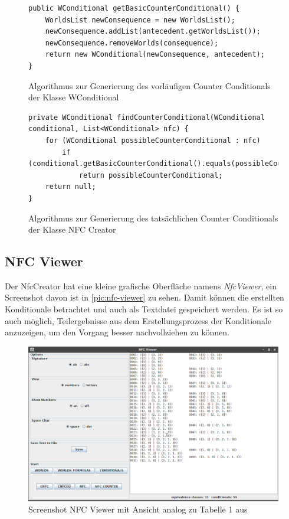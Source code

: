 \documentclass[12pt,a4paper]{article}
\begin{document}
\begin{figure}
\begin{lstlisting}
public WConditional getBasicCounterConditional() {
    WorldsList newConsequence = new WorldsList();
    newConsequence.addList(antecedent.getWorldsList());
    newConsequence.removeWorlds(consequence);
    return new WConditional(newConsequence, antecedent);
}
\end{lstlisting}
\caption{Algorithmus zur Generierung des vorläufigen Counter Conditionals der Klasse WConditional}
\label{code:basic-counter}
\end{figure} 


\begin{figure}
\begin{lstlisting}
private WConditional findCounterConditional(WConditional conditional, List<WConditional> nfc) {
    for (WConditional possibleCounterConditional : nfc)
        if (conditional.getBasicCounterConditional().equals(possibleCounterConditional))
            return possibleCounterConditional;
    return null;
}
\end{lstlisting}
\caption{Algorithmus zur Generierung des tatsächlichen Counter Conditionals der Klasse NFC Creator}
\label{code:real-counter}
\end{figure} 



\subsection{NFC Viewer}


Der NfcCreator hat eine kleine grafische Oberfläche namens \textit{NfcViewer}, ein Screenshot davon ist in \autoref{pic:nfc-viewer} zu sehen. Damit können die erstellten Konditionale betrachtet und auch als Textdatei gespeichert werden. Es ist so auch möglich, Teilergebnisse aus dem Erstellungsprozess der Konditionale anzuzeigen, um den Vorgang besser nachvollziehen zu können.


\begin{figure}
\includegraphics[width=0.9\linewidth]{bilder/nfc-viewer.png}

\caption{Screenshot NFC Viewer mit Ansicht analog zu Tabelle 1 aus \cite{beierle19}}
\label{pic:nfc-viewer}
\end{figure}
\end{document}
